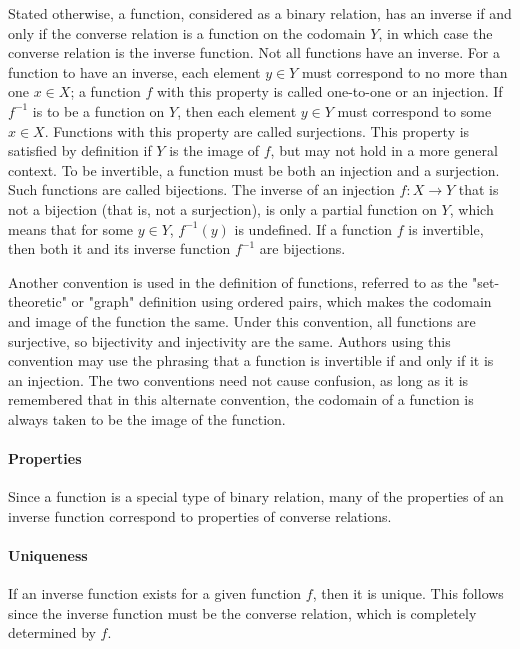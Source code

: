 Stated otherwise, a function, considered as a binary relation, has an inverse if and only if the converse relation is a function on the codomain $Y$, in which case the converse relation is the inverse function. Not all functions have an inverse. For a function to have an inverse, each element $y \in Y$ must correspond to no more than one $x \in X$; a function $f$ with this property is called one-to-one or an injection. If $f^{-1}$ is to be a function on $Y$, then each element $y \in Y$ must correspond to some $x \in X$. Functions with this property are called surjections. This property is satisfied by definition if $Y$ is the image of $f$, but may not hold in a more general context. To be invertible, a function must be both an injection and a surjection. Such functions are called bijections. The inverse of an injection $f: X \to Y$ that is not a bijection (that is, not a surjection), is only a partial function on $Y$, which means that for some $y \in Y$, $f^{-1}(y)$ is undefined. If a function $f$ is invertible, then both it and its inverse function $f^{-1}$ are bijections.


Another convention is used in the definition of functions, referred to as the "set-theoretic" or "graph" definition using ordered pairs, which makes the codomain and image of the function the same. Under this convention, all functions are surjective, so bijectivity and injectivity are the same. Authors using this convention may use the phrasing that a function is invertible if and only if it is an injection. The two conventions need not cause confusion, as long as it is remembered that in this alternate convention, the codomain of a function is always taken to be the image of the function.

\paragraph{Properties}

Since a function is a special type of binary relation, many of the properties of an inverse function correspond to properties of converse relations.

\paragraph{Uniqueness}

If an inverse function exists for a given function $f$, then it is unique. This follows since the inverse function must be the converse relation, which is completely determined by $f$.

